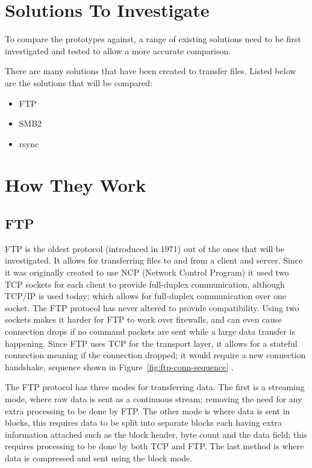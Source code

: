 \section{Solutions To Investigate}
To compare the prototypes against, a range of existing solutions need to be first investigated and tested to allow a more accurate comparison.

There are many solutions that have been created to transfer files. Listed below are the solutions that will be compared:

\begin{itemize}
	\item FTP
	\item SMB2
	\item rsync
\end{itemize}


\section{How They Work}
\subsection*{FTP}
FTP is the oldest protocol (introduced in 1971) out of the ones that will be investigated. It allows for transferring files to and from a client and server. Since it was originally created to use NCP (Network Control Program) it used two TCP sockets for each client to provide full-duplex communication, although TCP/IP is used today; which allows for full-duplex communication over one socket. The FTP protocol has never altered to provide compatibility. Using two sockets makes it harder for FTP to work over firewalls, and can even cause connection drops if no command packets are sent while a large data transfer is happening. Since FTP uses TCP for the transport layer, it allows for a stateful connection meaning if the connection dropped; it would require a new connection handshake, sequence shown in Figure~\ref{fig:ftp-conn-sequence} \parencite{ftp-rfc959}.

The FTP protocol has three modes for transferring data. The first is a streaming mode, where raw data is sent as a continuous stream; removing the need for any extra processing to be done by FTP. The other mode is where data is sent in blocks, this requires data to be split into separate blocks each having extra information attached such as the block header, byte count and the data field; this requires processing to be done by both TCP and FTP. The last method is where data is compressed and sent using the block mode.

